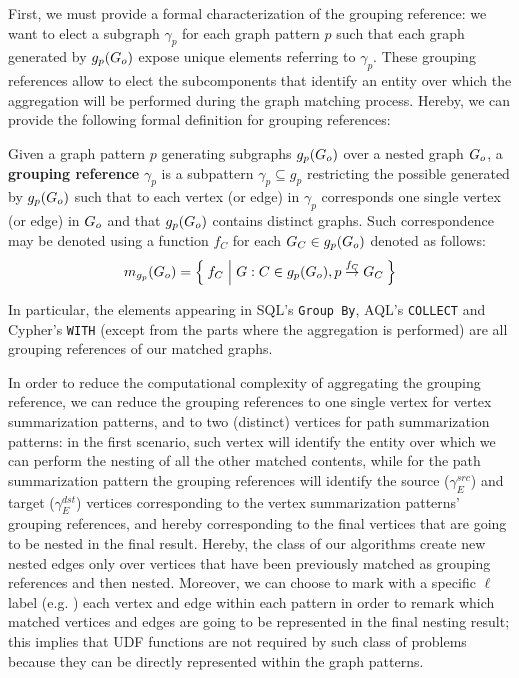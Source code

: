 First, we must provide a formal characterization of the grouping reference: we want to elect a subgraph $\gamma_p$ for each graph pattern $p$ such that each graph generated by  ${g_p}(G_o)$ expose unique elements referring to $\gamma_p$. %
These grouping references allow to elect the subcomponents that identify an entity over which the aggregation will be performed during the graph matching process. Hereby, we can provide the following formal definition for grouping references:
\begin{definition}
	Given a graph pattern $p$ generating subgraphs ${g_p}(G_o)$ over a nested graph $G_o$, a \textbf{grouping reference} $\gamma_p$ is a subpattern $\gamma_p\subseteq g_p$ restricting the possible  generated by ${g_p}(G_o)$ such that to each vertex (or edge) in $\gamma_p$ corresponds one single vertex (or edge) in $G_o$ and that $g_p(G_o)$ contains distinct graphs. Such correspondence may be denoted using a function $f_C$ for each $G_C\in g_p(G_o)$ denoted as follows:
	\[m_{g_p}(G_o)=\Set{f_C|G:C\in g_p(\ensuremath{G_o}), p \overset{f_C}{\to} G_C}\]
\end{definition}

In particular, the elements appearing in SQL's \texttt{Group By}, AQL's \texttt{COLLECT} and Cypher's \texttt{WITH} (except from the parts where the aggregation is performed) are all grouping references of our matched graphs.

In order to reduce the computational complexity of aggregating the grouping reference, we can reduce the grouping references to one single vertex for vertex summarization patterns, and to two (distinct) vertices for path summarization patterns: in the first scenario, such vertex will identify the entity over which we can perform the nesting of all the other matched contents, while for the path summarization pattern the grouping references will identify the source ($\gamma_E^{src}$) and target ($\gamma_E^{dst}$) vertices corresponding to the vertex summarization patterns' grouping references, and hereby corresponding to the final vertices that are going to be nested in the final result. Hereby, the class of our algorithms create new nested edges only over vertices that have been previously matched as grouping references and then nested. Moreover, we can choose to mark with a specific $\ell$ label (e.g. ) each vertex and edge within each pattern in order to remark which matched vertices and edges are going to be represented in the final nesting result; this implies that UDF functions are not required by such class of problems because they can be directly represented within the graph patterns.


